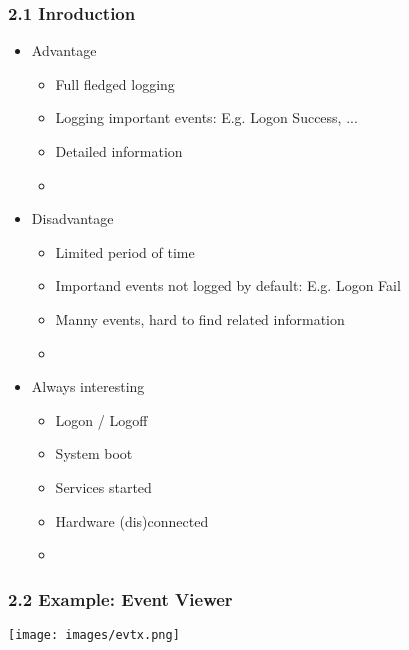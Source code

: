 \begin{frame}[fragile]
  \frametitle{2.1 Inroduction}
    \begin{itemize}
        \item Advantage
            \begin{itemize}
                \item Full fledged logging
                \item Logging important events: E.g. Logon Success, ...
                \item Detailed information
		\item[] 
            \end{itemize}
        \item Disadvantage
            \begin{itemize}
                \item Limited period of time
                \item Importand events not logged by default: E.g. Logon Fail
                \item Manny events, hard to find related information
		\item[]
            \end{itemize}
        \item Always interesting
            \begin{itemize}
                \item Logon / Logoff
                \item System boot
                \item Services started
		\item Hardware (dis)connected
		\item[]
            \end{itemize}
    \end{itemize}
\end{frame}


\begin{frame}[fragile]
  \frametitle{2.2 Example: Event Viewer}
    \texttt{[image: images/evtx.png]}
\end{frame}


